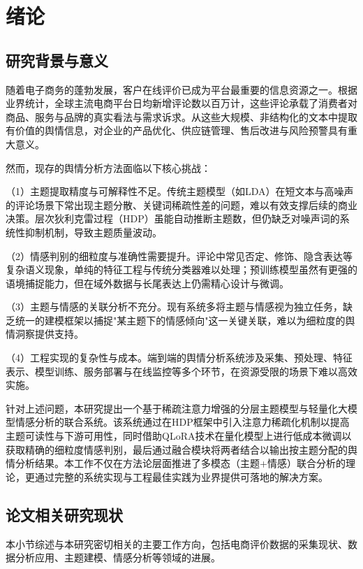 \chapter{绪\quad 论}
\label{ch:intro}

\section{研究背景与意义}
\label{sec:background}

随着电子商务的蓬勃发展，客户在线评价已成为平台最重要的信息资源之一。根据业界统计，全球主流电商平台日均新增评论数以百万计，这些评论承载了消费者对商品、服务与品牌的真实看法与需求诉求。从这些大规模、非结构化的文本中提取有价值的舆情信息，对企业的产品优化、供应链管理、售后改进与风险预警具有重大意义。

然而，现存的舆情分析方法面临以下核心挑战：

（1）主题提取精度与可解释性不足。传统主题模型（如LDA）在短文本与高噪声的评论场景下常出现主题分散、关键词稀疏性差的问题，难以有效支撑后续的商业决策。层次狄利克雷过程（HDP）虽能自动推断主题数，但仍缺乏对噪声词的系统性抑制机制，导致主题质量波动。

（2）情感判别的细粒度与准确性需要提升。评论中常见否定、修饰、隐含表达等复杂语义现象，单纯的特征工程与传统分类器难以处理；预训练模型虽然有更强的语境捕捉能力，但在域外数据与长尾表达上仍需精心设计与微调。

（3）主题与情感的关联分析不充分。现有系统多将主题与情感视为独立任务，缺乏统一的建模框架以捕捉"某主题下的情感倾向"这一关键关联，难以为细粒度的舆情洞察提供支持。

（4）工程实现的复杂性与成本。端到端的舆情分析系统涉及采集、预处理、特征表示、模型训练、服务部署与在线监控等多个环节，在资源受限的场景下难以高效实施。

针对上述问题，本研究提出一个基于稀疏注意力增强的分层主题模型与轻量化大模型情感分析的联合系统。该系统通过在HDP框架中引入注意力稀疏化机制以提高主题可读性与下游可用性，同时借助QLoRA技术在量化模型上进行低成本微调以获取精确的细粒度情感判别，最后通过融合模块将两者结合以输出按主题分配的舆情分析结果。本工作不仅在方法论层面推进了多模态（主题+情感）联合分析的理论，更通过完整的系统实现与工程最佳实践为业界提供可落地的解决方案。

\section{论文相关研究现状}
\label{sec:literature}

本小节综述与本研究密切相关的主要工作方向，包括电商评价数据的采集现状、数据分析应用、主题建模、情感分析等领域的进展。

